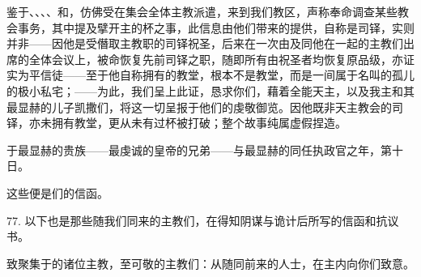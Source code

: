 鉴于、、、、和，仿佛受在集会全体主教派遣，来到我们教区，声称奉命调查某些教会事务，其中提及擘开主的杯之事，此信息由他们带来的提供，自称是司铎，实则并非——因他是受僭取主教职的司铎祝圣，后来在一次由及同他在一起的主教们出席的全体会议上，被命恢复先前司铎之职，随即所有由祝圣者均恢复原品级，亦证实为平信徒——至于他自称拥有的教堂，根本不是教堂，而是一间属于名叫的孤儿的极小私宅；——为此，我们呈上此证，恳求你们，藉着全能天主，以及我主和其最显赫的儿子凯撒们，将这一切呈报于他们的虔敬御览。因他既非天主教会的司铎，亦未拥有教堂，更从未有过杯被打破；整个故事纯属虚假捏造。\par

于最显赫的贵族——最虔诚的皇帝的兄弟——与最显赫的同任执政官之年，第十日。\par

这些便是们的信函。\par

77. 以下也是那些随我们同来的主教们，在得知阴谋与诡计后所写的信函和抗议书。\par

致聚集于的诸位主教，至可敬的主教们：从随同前来的人士，在主内向你们致意。\par

